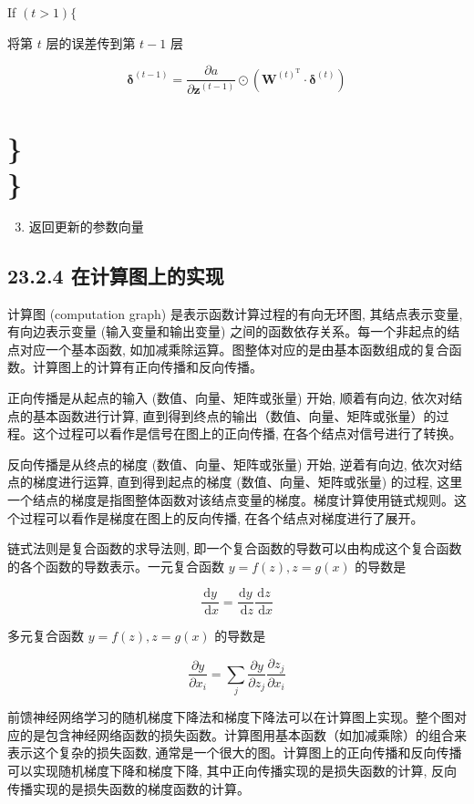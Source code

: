 \documentclass[10pt]{article}
\begin{document}
\begin{CJK*}{UTF8}{bsmi}
If $(t>1)\{$

将第 $t$ 层的误差传到第 $t-1$ 层

$$
\boldsymbol{\delta}^{(t-1)}=\frac{\partial a}{\partial \boldsymbol{z}^{(t-1)}} \odot\left(\boldsymbol{W}^{(t)^{\mathrm{T}}} \cdot \boldsymbol{\delta}^{(t)}\right)
$$

\section*{\} \\
 \}}
\begin{enumerate}
  \setcounter{enumi}{2}
  \item 返回更新的参数向量
\end{enumerate}

\subsection*{23.2.4 在计算图上的实现}
计算图 (computation graph) 是表示函数计算过程的有向无环图, 其结点表示变量, 有向边表示变量 (输入变量和输出变量) 之间的函数依存关系。每一个非起点的结点对应一个基本函数, 如加减乘除运算。图整体对应的是由基本函数组成的复合函数。计算图上的计算有正向传播和反向传播。

正向传播是从起点的输入 (数值、向量、矩阵或张量) 开始, 顺着有向边, 依次对结点的基本函数进行计算, 直到得到终点的输出（数值、向量、矩阵或张量）的过程。这个过程可以看作是信号在图上的正向传播, 在各个结点对信号进行了转换。

反向传播是从终点的梯度 (数值、向量、矩阵或张量) 开始, 逆着有向边, 依次对结点的梯度进行运算, 直到得到起点的梯度 (数值、向量、矩阵或张量) 的过程, 这里一个结点的梯度是指图整体函数对该结点变量的梯度。梯度计算使用链式规则。这个过程可以看作是梯度在图上的反向传播, 在各个结点对梯度进行了展开。

链式法则是复合函数的求导法则, 即一个复合函数的导数可以由构成这个复合函数的各个函数的导数表示。一元复合函数 $y=f(z), z=g(x)$ 的导数是

$$
\frac{\mathrm{d} y}{\mathrm{~d} x}=\frac{\mathrm{d} y}{\mathrm{~d} z} \frac{\mathrm{d} z}{\mathrm{~d} x}
$$

多元复合函数 $y=f(z), z=g(x)$ 的导数是

$$
\frac{\partial y}{\partial x_{i}}=\sum_{j} \frac{\partial y}{\partial z_{j}} \frac{\partial z_{j}}{\partial x_{i}}
$$

前馈神经网络学习的随机梯度下降法和梯度下降法可以在计算图上实现。整个图对应的是包含神经网络函数的损失函数。计算图用基本函数（如加减乘除）的组合来表示这个复杂的损失函数, 通常是一个很大的图。计算图上的正向传播和反向传播可以实现随机梯度下降和梯度下降, 其中正向传播实现的是损失函数的计算, 反向传播实现的是损失函数的梯度函数的计算。


\end{CJK*}
\end{document}
